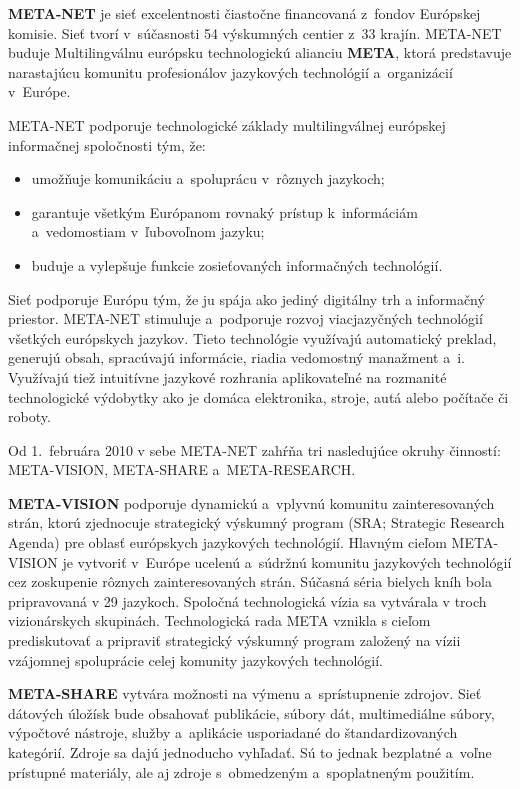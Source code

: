 \begin{multicols}{2}
  \textbf{META-NET} je sieť excelentnosti čiastočne financovaná
  z~fondov Európskej komisie. Sieť tvorí v~súčasnosti 54 výskumných
  centier z~33 krajín\cite{rehm2011}. META-NET buduje Multilingválnu
  európsku technologickú alianciu \textbf{META}, ktorá predstavuje
  narastajúcu komunitu profesionálov jazykových technológií
  a~organizácií v~Európe.

  META-NET podporuje technologické základy multilingválnej európskej
  informačnej spoločnosti tým, že:

\begin{itemize}
\item umožňuje komunikáciu a~spoluprácu v~rôznych jazykoch;
\item garantuje všetkým Európanom rovnaký prístup k~informáciám
  a~vedomostiam v~ľubovoľnom jazyku;
\item buduje a vylepšuje funkcie zosieťovaných informačných
  technológií.
\end{itemize}

Sieť podporuje Európu tým, že ju spája ako jediný digitálny trh a
informačný priestor. META-NET stimuluje a~podporuje rozvoj
viacjazyčných technológií všetkých európskych jazykov. Tieto
technológie využívajú automatický preklad, generujú obsah, spracúvajú
informácie, riadia vedomostný manažment a~i. Využívajú tiež intuitívne
jazykové rozhrania aplikovateľné na rozmanité technologické výdobytky
ako je domáca elektronika, stroje, autá alebo počítače či roboty.

Od 1.~februára 2010 v sebe META-NET zahŕňa tri nasledujúce okruhy
činností: META-VISION, META-SHARE a~META-RESEARCH.

\textbf{META-VISION} podporuje dynamickú a~vplyvnú komunitu
zainteresovaných strán, ktorú zjednocuje strategický výskumný program
(SRA; Strategic Research Agenda) pre oblasť európskych jazykových
technológií. Hlavným cieľom META-VISION je vytvoriť v~Európe ucelenú
a~súdržnú komunitu jazykových technológií cez zoskupenie rôznych
zainteresovaných strán. Súčasná séria bielych kníh bola pripravovaná v
29 jazykoch. Spoločná technologická vízia sa vytvárala v troch
vizionárskych skupinách. Technologická rada META vznikla s cieľom
prediskutovať a pripraviť strategický výskumný program založený na
vízii vzájomnej spoluprácie celej komunity jazykových technológií.

\textbf{META-SHARE} vytvára možnosti na výmenu a~sprístupnenie
zdrojov. Sieť dátových úložísk bude obsahovať publikácie, súbory dát,
multimediálne súbory, výpočtové nástroje, služby a~aplikácie
usporiadané do štandardizovaných kategórií. Zdroje sa dajú jednoducho
vyhľadať. Sú to jednak bezplatné a~voľne prístupné materiály, ale aj
zdroje s~obmedzeným a~spoplatneným použitím.


\end{multicols}
